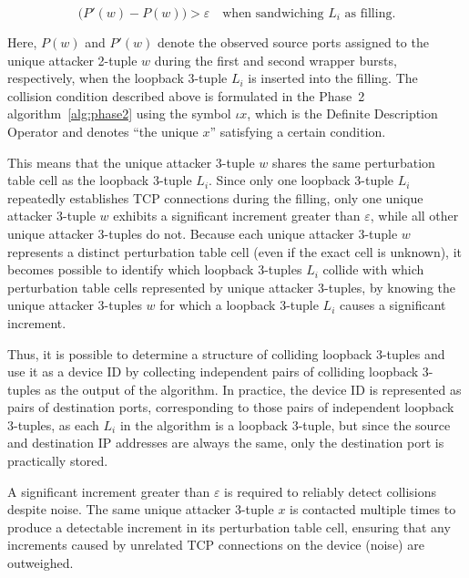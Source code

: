 \documentclass[twocolumn]{report}
\begin{document}
\begin{minipage}{\columnwidth}
	\begin{equation*}
		\bigl(P'(w) - P(w)\bigr) > \varepsilon
		\quad \text{when sandwiching } L_i \text{ as filling.}
	\end{equation*}
\end{minipage}

Here, \(P(w)\) and \(P'(w)\) denote the observed \alert{source ports assigned to} the \alert{unique attacker 2-tuple \(w\)} during the first and second wrapper bursts, respectively, when the loopback 3-tuple \(L_i\) is inserted into the filling. The collision condition described above is formulated in the Phase~2 algorithm~\ref{alg:phase2} using the symbol \(\iota x\), which is the \alert{Definite Description Operator} and denotes \enquote{the unique \(x\)} satisfying a certain condition.

This means that the unique attacker 3-tuple \(w\) shares the same perturbation table cell as the loopback 3-tuple \(L_i\). Since \alert{only one} loopback 3-tuple \(L_i\) repeatedly establishes TCP connections during the filling, only one unique attacker 3-tuple \(w\) exhibits a \alert{significant increment} greater than \(\varepsilon\), while all other unique attacker 3-tuples do not. Because each unique attacker 3-tuple \(w\) represents a distinct perturbation table cell (even if the exact cell is unknown), it becomes possible to identify which loopback 3-tuples \(L_i\) collide with which perturbation table cells represented by unique attacker 3-tuples, by knowing the unique attacker 3-tuples \(w\) for which a loopback 3-tuple \(L_i\) causes a significant increment.

Thus, it is possible to determine a structure of colliding loopback 3-tuples and use it as a device ID by collecting independent pairs of colliding loopback 3-tuples as the \alert{output} of the algorithm. In practice, the device ID is represented as \alert{pairs of destination ports}, corresponding to those pairs of independent loopback 3-tuples, as each $L_i$ in the algorithm is a loopback 3-tuple, but since the source and destination IP addresses are always the same, only the destination port is practically stored.

A significant increment greater than \(\varepsilon\) is required to reliably detect collisions despite \alert{noise}. The same unique attacker 3-tuple \(x\) is contacted \alert{multiple times} to produce a detectable increment in its perturbation table cell, ensuring that any increments caused by unrelated TCP connections on the device (noise) are outweighed.
\end{document}
